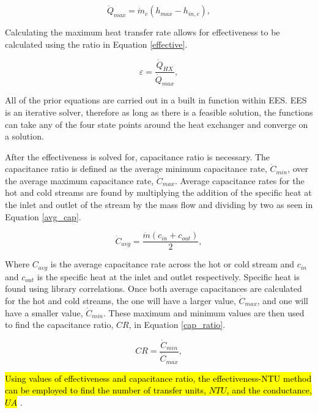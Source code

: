\begin{paracol}{2}
\begin{equation}
    \label{heattrans_max}
    \dot{Q}_{max} = \dot{m}_{c}(h_{max}-h_{in,c}),
\end{equation}

Calculating the maximum heat transfer rate allows for effectiveness to be calculated using the ratio in Equation \ref{effective}.

\begin{equation}
    \label{effective}
    \varepsilon = \frac{\dot{Q}_{HX}}{\dot{Q}_{max}},
\end{equation}

All of the prior equations are carried out in a built in function within EES. EES is an iterative solver, therefore as long as there is a feasible solution, the functions can take any of the four state points around the heat exchanger and converge on a solution.

After the effectiveness is solved for, capacitance ratio is necessary. The capacitance ratio is defined as the average minimum capacitance rate, $\dot{C}_{min}$, over the average maximum capacitance rate, $\dot{C}_{max}$. Average capacitance rates for the hot and cold streams are found by multiplying the addition of the specific heat at the inlet and outlet of the stream by the mass flow and dividing by two as seen in Equation \ref{avg_cap}.

\begin{equation}
    \label{avg_cap}
    \dot{C}_{avg} = \frac{\dot{m}(c_{in}+c_{out})}{2},
\end{equation}

Where $C_{avg}$ is the average capacitance rate across the hot or cold stream and $c_{in}$ and $c_{out}$ is the specific heat at the inlet and outlet respectively. Specific heat is found using library correlations. Once both average capacitances are calculated for the hot and cold streams, the one will have a larger value, $\dot{C}_{max}$, and one will have a smaller value,  $\dot{C}_{min}$. These maximum and minimum values are then used to find the capacitance ratio, $CR$, in Equation \ref{cap_ratio}.

\begin{equation}
    \label{cap_ratio}
    CR = \frac{\dot{C}_{min}}{\dot{C}_{max}},
\end{equation}

\hl{Using values of effectiveness and capacitance ratio, the effectiveness-NTU method can be employed to find the number of transfer units, $NTU$, and the conductance, $UA$} \cite{klein_nellis_2011,nellis_klein_2008}. 




\end{paracol}
